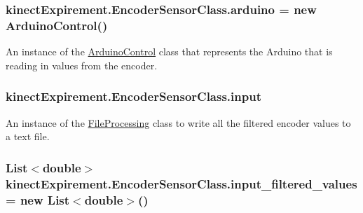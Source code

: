 \subsubsection[{\texorpdfstring{arduino}{arduino}}]{ kinect\+Expirement.\+Encoder\+Sensor\+Class.\+arduino = new {\bf Arduino\+Control}()\hspace{0.3cm}{\ttfamily [static]}}\hypertarget{classkinect_expirement_1_1_encoder_sensor_class_a5581b60b2dc6c9311ae5318772aa92f1}{}\label{classkinect_expirement_1_1_encoder_sensor_class_a5581b60b2dc6c9311ae5318772aa92f1}


An instance of the {\ttfamily \hyperlink{classkinect_expirement_1_1_arduino_control}{Arduino\+Control}} class that represents the Arduino that is reading in values from the encoder. 

\subsubsection[{\texorpdfstring{input}{input}}]{ kinect\+Expirement.\+Encoder\+Sensor\+Class.\+input\hspace{0.3cm}{\ttfamily [static]}}\hypertarget{classkinect_expirement_1_1_encoder_sensor_class_aece38a4f443111c5f0b415463d751fe4}{}\label{classkinect_expirement_1_1_encoder_sensor_class_aece38a4f443111c5f0b415463d751fe4}


An instance of the {\ttfamily \hyperlink{classkinect_expirement_1_1_file_processing}{File\+Processing}} class to write all the filtered encoder values to a text file. 

\subsubsection[{\texorpdfstring{input\+\_\+filtered\+\_\+values}{input_filtered_values}}]{\setlength{\rightskip}{0pt plus 5cm}List$<$double$>$ kinect\+Expirement.\+Encoder\+Sensor\+Class.\+input\+\_\+filtered\+\_\+values = new List$<$double$>$()\hspace{0.3cm}{\ttfamily [static]}}\hypertarget{classkinect_expirement_1_1_encoder_sensor_class_a19b9e4e6fe72872dcab2c82a91470c3a}{}\label{classkinect_expirement_1_1_encoder_sensor_class_a19b9e4e6fe72872dcab2c82a91470c3a}


